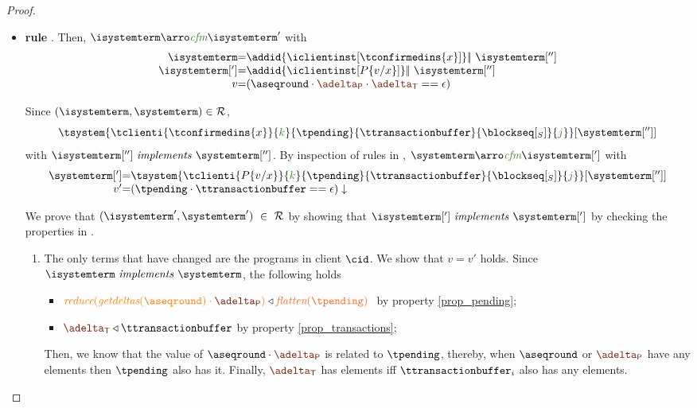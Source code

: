\begin{proof}
\begin{itemize}
\begin{itemize}
\begin{enumerate}
					\end{enumerate}

\item {\bf rule }. Then, $\isystemterm  \arroi{\confirmedtran} \isystemterm '$ with 
				\[\begin{array}{r@{=}l}
					\isystemterm & \addid{\iclientinst[\tconfirmedins{x}]} \bigpar \ \isystemterm['']
					\\
					\isystemterm['] & \addid{\iclientinst[P\subst{x}{v}]} \bigpar \ \isystemterm['']	
					\\
					v & (\pending  \cdot \pushbuffer \cdot\transactionbuffer == \epsilon) 
				  \end{array}
				\]
		
		
				Since $(\isystemterm,\systemterm)\in \mathcal{R}$,
				\[\tsystem{\tclienti{\tconfirmedins{x}}{\tknown}{\tpending}{\ttransactionbuffer}{\tsent}{\treceivebuffer}}[{\systemterm['']}]\]
				with $\implements{\isystemterm['']}{\systemterm['']}$. By inspection of rules in \figref{}, 
				$\systemterm \arroi{\confirmedtran} \isystemterm[']$ with
				\[\begin{array}{r@{=}l}
					\systemterm['] & \tsystem{\tclienti{{\tprogram}\subst{x}{v}}
		{\tknown}{\tpending}{\ttransactionbuffer}{\tsent}{\treceivebuffer}}[{\systemterm['']}]	\\
					v' & \eval{(\tpending \cdot  \ttransactionbuffer == \epsilon)}
				  \end{array}		
				\]
				
				We  prove that $(\isystemterm',\systemterm') \ \in \ \mathcal{R}$ by showing that $\implements{\isystemterm[']}{\systemterm[']}$ 
				by checking the properties in .			
					\begin{enumerate}
						\item The only terms that have changed are the programs in client $\cid$.  We show that $v=v'$ holds. Since 
						$\implements{\isystemterm}{\systemterm}$, the following holds
						\begin{itemize}
							\item $\ireduce{\igetdeltas{\pending}\cdot{\pushbuffer}}\triangleleft \flatten{\tpending} \ $ by property \ref{prop_pending};
							\item $\transactionbuffer \triangleleft{\ttransactionbuffer}$ by property \ref{prop_transactions};
						\end{itemize}
						Then, we know that the value of $\pending \cdot \pushbuffer$ is related to $\tpending$, thereby, when $\pending$ or $\pushbuffer$ have any elements then $\tpending$ also has it. Finally, $\transactionbuffer$ has elements iff $\ttransactionbuffer_i$ also has any elements.
			

\end{enumerate}
\end{itemize}
\end{itemize}
\end{proof}
